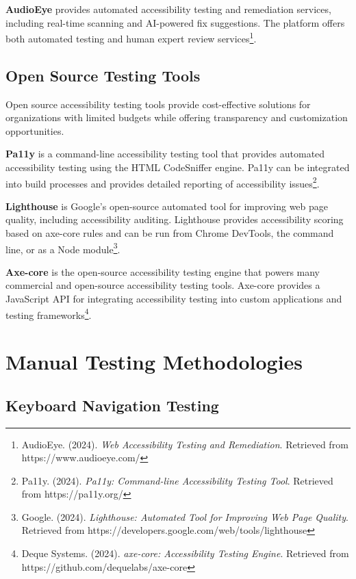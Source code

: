 \textbf{AudioEye} provides automated accessibility testing and remediation services, including real-time scanning and AI-powered fix suggestions. The platform offers both automated testing and human expert review services\footnote{AudioEye. (2024). \textit{Web Accessibility Testing and Remediation}. Retrieved from https://www.audioeye.com/}.

\subsection{Open Source Testing Tools}

Open source accessibility testing tools provide cost-effective solutions for organizations with limited budgets while offering transparency and customization opportunities.

\textbf{Pa11y} is a command-line accessibility testing tool that provides automated accessibility testing using the HTML CodeSniffer engine. Pa11y can be integrated into build processes and provides detailed reporting of accessibility issues\footnote{Pa11y. (2024). \textit{Pa11y: Command-line Accessibility Testing Tool}. Retrieved from https://pa11y.org/}.

\textbf{Lighthouse} is Google's open-source automated tool for improving web page quality, including accessibility auditing. Lighthouse provides accessibility scoring based on axe-core rules and can be run from Chrome DevTools, the command line, or as a Node module\footnote{Google. (2024). \textit{Lighthouse: Automated Tool for Improving Web Page Quality}. Retrieved from https://developers.google.com/web/tools/lighthouse}.

\textbf{Axe-core} is the open-source accessibility testing engine that powers many commercial and open-source accessibility testing tools. Axe-core provides a JavaScript API for integrating accessibility testing into custom applications and testing frameworks\footnote{Deque Systems. (2024). \textit{axe-core: Accessibility Testing Engine}. Retrieved from https://github.com/dequelabs/axe-core}.

\section{Manual Testing Methodologies}
\label{sec:manual-methods}

\subsection{Keyboard Navigation Testing}

